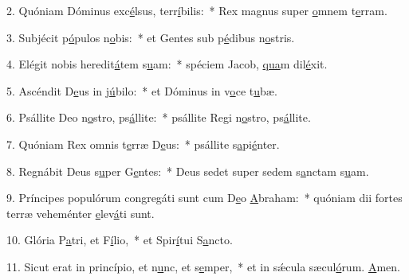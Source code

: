 2. Quóniam Dóminus exc\uline{é}lsus, terr\uline{í}bilis:~* Rex magnus super \uline{o}mnem t\uline{e}rram.\par 
3. Subjécit p\uline{ó}pulos n\uline{o}bis:~* et Gentes sub p\uline{é}dibus n\uline{o}stris.\par 
4. Elégit nobis heredit\uline{á}tem s\uline{u}am:~* spéciem Jacob, \uline{qua}m dil\uline{é}xit.\par 
5. Ascéndit D\uline{e}us in j\uline{ú}bilo:~* et Dóminus in v\uline{o}ce t\uline{u}bæ.\par 
6. Psállite Deo n\uline{o}stro, ps\uline{á}llite:~* psállite Regi n\uline{o}stro, ps\uline{á}llite.\par 
7. Quóniam Rex omnis t\uline{e}rræ D\uline{e}us:~* psállite s\uline{a}pi\uline{é}nter.\par 
8. Regnábit Deus s\uline{u}per G\uline{e}ntes:~* Deus sedet super sedem s\uline{a}nctam s\uline{u}am.\par 
9. Príncipes populórum congregáti sunt cum D\uline{e}o \uline{A}braham:~* quóniam dii fortes terræ veheménter \uline{e}lev\uline{á}ti sunt.\par 
10. Glória P\uline{a}tri, et F\uline{í}lio,~* et Spir\uline{í}tui S\uline{a}ncto.\par 
11. Sicut erat in princípio, et n\uline{u}nc, et s\uline{e}mper,~* et in sǽcula sæcul\uline{ó}rum. \uline{A}men.\par 
